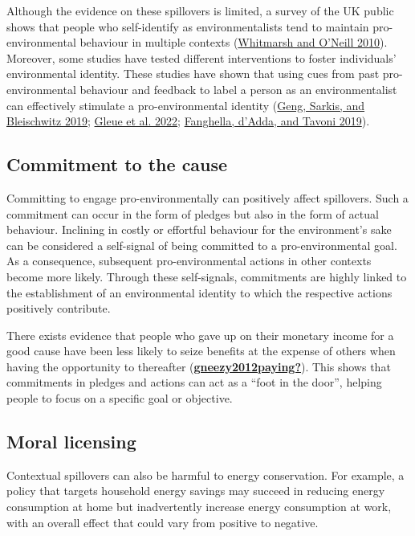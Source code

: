 \documentclass[
  11pt,
]{article}
\begin{document}
Although the evidence on these spillovers is limited, a survey of the UK
public shows that people who self-identify as environmentalists tend to
maintain pro-environmental behaviour in multiple contexts
(\protect\hyperlink{ref-whitmarsh2010green}{Whitmarsh and O'Neill
2010}). Moreover, some studies have tested different interventions to
foster individuals' environmental identity. These studies have shown
that using cues from past pro-environmental behaviour and feedback to
label a person as an environmentalist can effectively stimulate a
pro-environmental identity
(\protect\hyperlink{ref-geng2019globalize}{Geng, Sarkis, and Bleischwitz
2019}; \protect\hyperlink{ref-gleue2022identity}{Gleue et al. 2022};
\protect\hyperlink{ref-fanghella2019use}{Fanghella, d'Adda, and Tavoni
2019}).

\hypertarget{commitment-to-the-cause}{%
\subsection{Commitment to the cause}\label{commitment-to-the-cause}}

Committing to engage pro-environmentally can positively affect
spillovers. Such a commitment can occur in the form of pledges but also
in the form of actual behaviour. Inclining in costly or effortful
behaviour for the environment's sake can be considered a self-signal of
being committed to a pro-environmental goal. As a consequence,
subsequent pro-environmental actions in other contexts become more
likely. Through these self-signals, commitments are highly linked to the
establishment of an environmental identity to which the respective
actions positively contribute.

There exists evidence that people who gave up on their monetary income
for a good cause have been less likely to seize benefits at the expense
of others when having the opportunity to thereafter
(\protect\hyperlink{ref-gneezy2012paying}{\textbf{gneezy2012paying?}}).
This shows that commitments in pledges and actions can act as a ``foot
in the door'', helping people to focus on a specific goal or objective.

\hypertarget{moral-licensing}{%
\subsection{Moral licensing}\label{moral-licensing}}

Contextual spillovers can also be harmful to energy conservation. For
example, a policy that targets household energy savings may succeed in
reducing energy consumption at home but inadvertently increase energy
consumption at work, with an overall effect that could vary from
positive to negative.
\end{document}
